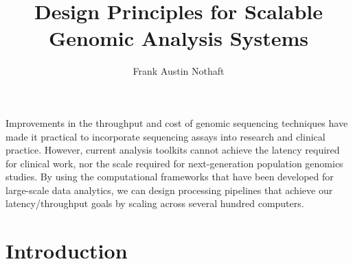 \documentclass[11pt]{article}
\date{}
\begin{document}
\title{Design Principles for Scalable Genomic Analysis Systems}
\author{Frank Austin Nothaft}
\maketitle

\abstract

Improvements in the throughput and cost of genomic sequencing techniques have made it practical to incorporate
sequencing assays into research and clinical practice. However, current analysis toolkits cannot achieve the latency
required for clinical work, nor the scale required for next-generation population genomics studies. By using the
computational frameworks that have been developed for large-scale data analytics, we can design processing
pipelines that achieve our latency/throughput goals by scaling across several hundred computers. 

\section{Introduction}
\end{document}
